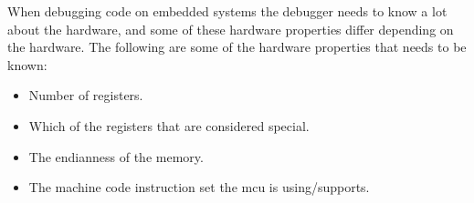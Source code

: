 

When debugging code on embedded systems the debugger needs to know a lot about the hardware, and some of these hardware properties differ depending on the hardware.
The following are some of the hardware properties that needs to be known:

\begin{itemize}
  \item Number of registers.
  \item Which of the registers that are considered special.
  \item The endianness of the memory.
  \item The machine code instruction set the \gls{mcu} is using/supports.
\end{itemize}





